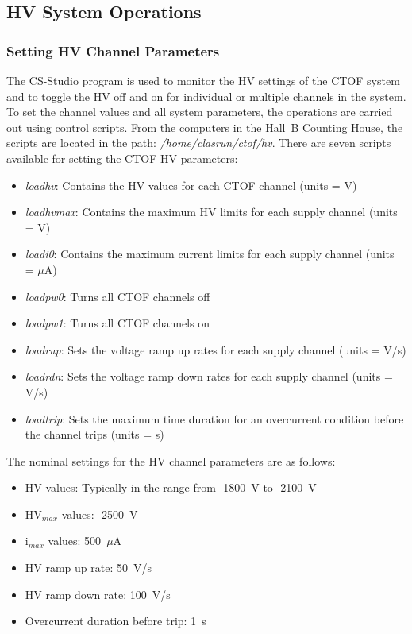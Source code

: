 \documentclass[12pt]{article}
\begin{document}
\subsection{HV System Operations}

\subsubsection{Setting HV Channel Parameters}
\label{hv-parms}

The CS-Studio program is used to monitor the HV settings of the CTOF system and to toggle the HV off
and on for individual or multiple channels in the system. To set the channel values and all system
parameters, the operations are carried out using control scripts. From the computers in the Hall~B 
Counting House, the scripts are located in the path: {\it /home/clasrun/ctof/hv}. There are 
seven scripts available for setting the CTOF HV parameters:

\begin{itemize}
\item {\it loadhv}: Contains the HV values for each CTOF channel (units = V)
\item {\it loadhvmax}: Contains the maximum HV limits for each supply channel (units = V)
\item {\it loadi0}: Contains the maximum current limits for each supply channel (units = $\mu$A)
\item {\it loadpw0}: Turns all CTOF channels off
\item {\it loadpw1}: Turns all CTOF channels on
\item {\it loadrup}: Sets the voltage ramp up rates for each supply channel (units = V/s)
\item {\it loadrdn}: Sets the voltage ramp down rates for each supply channel (units = V/s)
\item {\it loadtrip}: Sets the maximum time duration for an overcurrent condition before the 
channel trips (units = s)
\end{itemize}

The nominal settings for the HV channel parameters are as follows:

\begin{itemize}
\item HV values: Typically in the range from -1800~V to -2100~V
\item HV$_{max}$ values: -2500~V
\item i$_{max}$ values: 500~$\mu$A
\item HV ramp up rate: 50~V/s
\item HV ramp down rate: 100~V/s
\item Overcurrent duration before trip: 1~s
\end{itemize}
\end{document}
